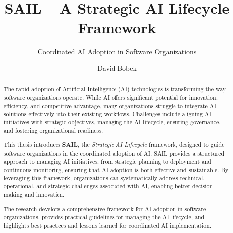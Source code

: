 \documentclass[]{imc-inf}
\begin{document}
	
	\title{SAIL -- A Strategic AI Lifecycle Framework}
	\subtitle{Coordinated AI Adoption in Software Organizations}
	\author{David Bobek}
	
    \frontmatter
    \maketitle{}
	\tableofcontents%
	\clearpage
	
	\listoftables%
	\clearpage
	
	\listoffigures%
	\clearpage

	\begin{declarations} \end{declarations}
    	
    
    \begin{acknowledgements}
    \end{acknowledgements}

	\begin{abstract}
        The rapid adoption of Artificial Intelligence (AI) technologies is transforming the way software organizations operate. While AI offers significant potential for innovation, efficiency, and competitive advantage, many organizations struggle to integrate AI solutions effectively into their existing workflows. Challenges include aligning AI initiatives with strategic objectives, managing the AI lifecycle, ensuring governance, and fostering organizational readiness.
		
		This thesis introduces \textbf{SAIL}, the \textit{Strategic AI Lifecycle} framework, designed to guide software organizations in the coordinated adoption of AI. SAIL provides a structured approach to managing AI initiatives, from strategic planning to deployment and continuous monitoring, ensuring that AI adoption is both effective and sustainable. By leveraging this framework, organizations can systematically address technical, operational, and strategic challenges associated with AI, enabling better decision-making and innovation.
		
		The research develops a comprehensive framework for AI adoption in software organizations, provides practical guidelines for managing the AI lifecycle, and highlights best practices and lessons learned for coordinated AI implementation.
	\end{abstract}
\end{document}

